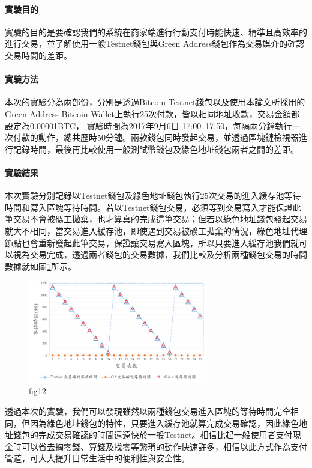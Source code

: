 			\paragraph{實驗目的}實驗的目的是要確認我們的系統在商家端進行行動支付時能快速、精準且高效率的進行交易，並了解使用一般Testnet錢包與Green Address錢包作為交易媒介的確認交易時間的差距。
			\paragraph{實驗方法}本次的實驗分為兩部份，分別是透過Bitcoin Testnet錢包以及使用本論文所採用的Green Address Bitcoin Wallet上執行25次付款，皆以相同地址收款，交易金額都設定為0.00001BTC， 實驗時間為2017年9月6日-17:00~17:50，每隔兩分鐘執行一次付款的動作，總共歷時50分鐘。兩款錢包同時發起交易，並透過區塊鏈檢視器進行記錄時間，最後再比較使用一般測試幣錢包及綠色地址錢包兩者之間的差距。
			\paragraph{實驗結果}本次實驗分別記錄以Testnet錢包及綠色地址錢包執行25次交易的進入緩存池等待時間和寫入區塊等待時間。若以Testnet錢包交易，必須等到交易寫入才能保證此筆交易不會被礦工拋棄，也才算真的完成這筆交易；但若以綠色地址錢包發起交易就大不相同，當交易進入緩存池，即使遇到交易被礦工拋棄的情況，綠色地址代理節點也會重新發起此筆交易，保證讓交易寫入區塊，所以只要進入緩存池我們就可以視為交易完成，透過兩者錢包的交易數據，我們比較及分析兩種錢包交易的時間數據就如圖\ref{fig12}所示。

			\begin{figure}[h]
				\centering
				\includegraphics[width = 0.7\textwidth]{fig12.png}
				\caption{fig12}\label{fig12}
			\end{figure}

透過本次的實驗，我們可以發現雖然以兩種錢包交易進入區塊的等待時間完全相同，但因為綠色地址錢包的特性，只要進入緩存池就算完成交易確認，因此綠色地址錢包的完成交易確認的時間遠遠快於一般Testnet。相信比起一般使用者支付現金時可以省去掏零錢、算錢及找零等繁瑣的動作快速許多，相信以此方式作為支付管道，可大大提升日常生活中的便利性與安全性。


    
